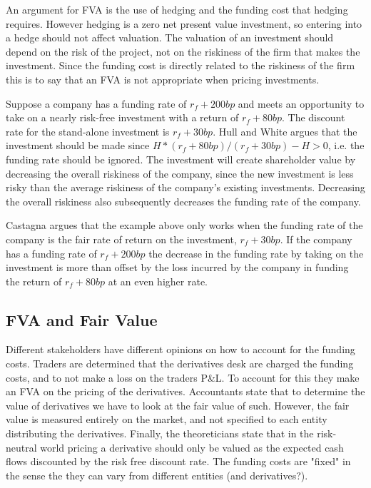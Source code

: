 \documentclass[10pt,a4paper]{article}
\begin{document}
        An argument for FVA is the use of hedging and the funding cost that hedging requires. However hedging is a zero net present value investment, so entering into a hedge should not affect valuation. The valuation of an investment should depend on the risk of the project, not on the riskiness of the firm that makes the investment. Since the funding cost is directly related to the riskiness of the firm this is to say that an FVA is not appropriate when pricing investments. 

        Suppose a company has a funding rate of $r_{f} + 200bp$ and meets an opportunity to take on a nearly risk-free investment with a return of $r_{f} + 80bp$. The discount rate for the stand-alone investment is $r_{f} + 30bp$. Hull and White argues that the investment should be made since $H*(r_{f} + 80bp) / (r_{f} + 30bp) - H > 0$, i.e. the funding rate should be ignored. The investment will create shareholder value by decreasing the overall riskiness of the company, since the new investment is less risky than the average riskiness of the company's existing investments. Decreasing the overall riskiness also subsequently decreases the funding rate of the company. 

        Castagna argues that the example above only works when the funding rate of the company is the fair rate of return on the investment, $r_{f} + 30bp$. If the company has a funding rate of $r_{f} + 200bp$ the decrease in the funding rate by taking on the investment is more than offset by the loss incurred by the company in funding the return of $r_{f} + 80bp$ at an even higher rate.
    
    \subsection{FVA and Fair Value}
        Different stakeholders have different opinions on how to account for the funding costs. Traders are determined that the derivatives desk are charged the funding costs, and to not make a loss on the traders P\&L. To account for this they make an FVA on the pricing of the derivatives. Accountants state that to determine the value of derivatives we have to look at the fair value of such. However, the fair value is measured entirely on the market, and not specified to each entity distributing the derivatives. Finally, the theoreticians state that in the risk-neutral world pricing a derivative should only be valued as the expected cash flows discounted by the risk free discount rate. The funding costs are "fixed" in the sense the they can vary from different entities (and derivatives?).
\end{document}
